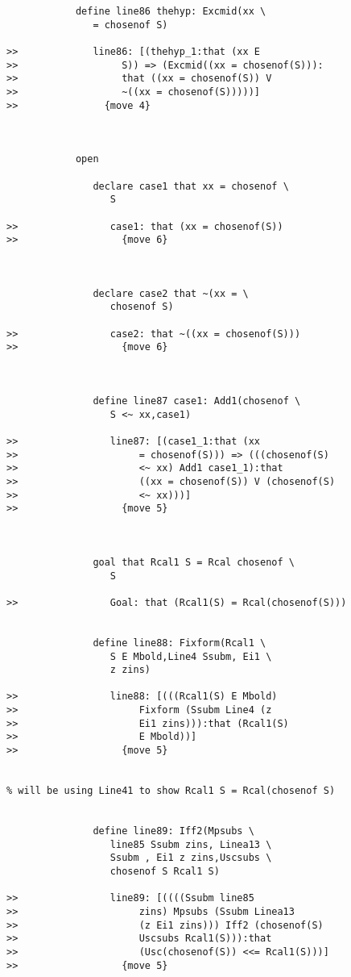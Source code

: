 \documentclass[12pt]{article}
\begin{document}
\begin{verbatim}
            define line86 thehyp: Excmid(xx \
               = chosenof S)

>>             line86: [(thehyp_1:that (xx E
>>                  S)) => (Excmid((xx = chosenof(S))):
>>                  that ((xx = chosenof(S)) V
>>                  ~((xx = chosenof(S)))))]
>>               {move 4}



            open

               declare case1 that xx = chosenof \
                  S

>>                case1: that (xx = chosenof(S))
>>                  {move 6}



               declare case2 that ~(xx = \
                  chosenof S)

>>                case2: that ~((xx = chosenof(S)))
>>                  {move 6}



               define line87 case1: Add1(chosenof \
                  S <~ xx,case1)

>>                line87: [(case1_1:that (xx
>>                     = chosenof(S))) => (((chosenof(S)
>>                     <~ xx) Add1 case1_1):that
>>                     ((xx = chosenof(S)) V (chosenof(S)
>>                     <~ xx)))]
>>                  {move 5}



               goal that Rcal1 S = Rcal chosenof \
                  S

>>                Goal: that (Rcal1(S) = Rcal(chosenof(S)))


               define line88: Fixform(Rcal1 \
                  S E Mbold,Line4 Ssubm, Ei1 \
                  z zins)

>>                line88: [(((Rcal1(S) E Mbold)
>>                     Fixform (Ssubm Line4 (z
>>                     Ei1 zins))):that (Rcal1(S)
>>                     E Mbold))]
>>                  {move 5}


% will be using Line41 to show Rcal1 S = Rcal(chosenof S)


               define line89: Iff2(Mpsubs \
                  line85 Ssubm zins, Linea13 \
                  Ssubm , Ei1 z zins,Uscsubs \
                  chosenof S Rcal1 S)

>>                line89: [((((Ssubm line85
>>                     zins) Mpsubs (Ssubm Linea13
>>                     (z Ei1 zins))) Iff2 (chosenof(S)
>>                     Uscsubs Rcal1(S))):that
>>                     (Usc(chosenof(S)) <<= Rcal1(S)))]
>>                  {move 5}




\end{verbatim}
\end{document}

